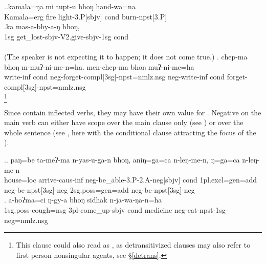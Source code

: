	
	\ex.\ag.kamala=ŋa mi tupt-u bhoŋ hand-wa=na\\
	Kamala{\sc =erg} fire   light{\sc -3.P[sbjv]} {\sc cond} burn{\sc -npst[3.P]}\\
		\bg.\label{cond-sbjv}ka  mas-a-bhy-a-ŋ bhoŋ, \\
{\sc 1sg} get\_lost{\sc -sbjv-V2.give-sbjv-1sg} {\sc cond}\\
 \\
(The speaker is not expecting it to happen; it does not come true.)
\bg. chep-ma bhoŋ m-muʔ-ni-me-n=ha. men-chep-ma bhoŋ muʔ-ni-me=ha\\
write{\sc -inf} {\sc cond} {\sc neg-}forget{\sc -compl[3sg]-npst=nmlz.nsg} {\sc neg-}write{\sc -inf} {\sc cond} forget{\sc -compl[3sg]-npst=nmlz.nsg}\\
\footnote{This clause could also read as , as detransitivized clauses may also refer to first person nonsingular agents, see §\ref{detrans}.}


Since  contain inflected verbs, they may have their own value for  \Next[a]. Negative   on the main verb can either have  scope over the main clause only (see \Next[a]) or over the whole sentence (see \Next[b], here with the conditional clause attracting the focus of the ).

\ex.\ag.	paŋ=be ta-meʔ-ma n-yas-u-ga-n bhoŋ, aniŋ=ga=ca n-leŋ-me-n, ŋ=ga=ca n-leŋ-me-n\\
			house={\sc loc} arrive{\sc -caus-inf} {\sc neg-}be\_able{\sc -3.P-2.A-neg[sbjv]} {\sc cond}  {\sc 1pl.excl=gen=add} 
			{\sc neg-}be{\sc -npst[3sg]-neg} {\sc 2sg.poss=gen=add}  {\sc neg-}be{\sc -npst[3sg]-neg}\\
			 
	\bg.	a-hoʔma=ci ŋ-gy-a bhoŋ sidhak n-ja-wa-ŋa-n=ha\\ %
			{\sc 1sg.poss-}cough={\sc nsg}  {\sc 3pl-}come\_up{\sc -sbjv} {\sc cond} medicine {\sc neg-}eat{\sc -npst-1sg-neg=nmlz.nsg}\\ %

